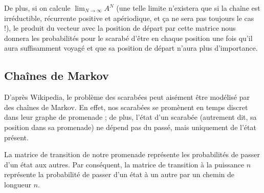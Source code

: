 \documentclass{scrartcl} \usepackage[utf8]{inputenc}
\begin{document}
  De plus, si on calcule $\lim_{N \to \infty} A^N$ (une telle limite
  n'existera que si la chaîne est irréductible, récurrente positive et
  apériodique, et ça ne sera pas toujours le cas !), le produit du
  vecteur avec la position de départ par cette matrice nous donnera
  les probabilités pour le scarabé d'être en chaque position une fois
  qu'il aura suffisamment voyagé et que sa position de départ n'aura
  plus d'importance.

  \subsection{Chaînes de Markov}

  D'après Wikipedia, le problème des scarabées peut aisément être
  modélisé par des chaînes de Markov. En effet, nos scarabées se
  promènent en temps discret dans leur graphe de promenade ; de plus,
  l'état d'un scarabée (autrement dit, sa position dans sa promenade)
  ne dépend pas du passé, mais uniquement de l'état présent.

  La matrice de transition de notre promenade représente les
  probabilités de passer d'un état aux autres. Par conséquent, la
  matrice de transition à la puissance $n$ représente la probabilité
  de passer d'un état à un autre par un chemin de longueur $n$.
\end{document}
